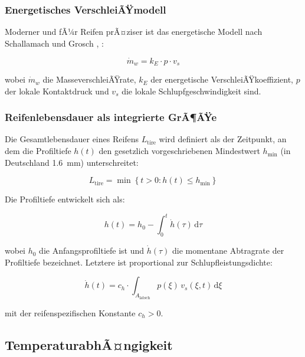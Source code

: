 ﻿\documentclass[12pt,a4paper]{article}
\theoremstyle{definition}
\theoremstyle{remark}
\newcommand{\Ltire}{L_{\mathrm{tire}}}
\begin{document}
\subsubsection{Energetisches VerschleiÃŸmodell}

Moderner und fÃ¼r Reifen prÃ¤ziser ist das energetische Modell nach
Schallamach und Grosch \cite{Schallamach1971}, \cite{Grosch1963}:

\begin{equation}
  \dot{m}_w = k_E \cdot p \cdot v_s
  \label{eq:energetisch}
\end{equation}

wobei $\dot{m}_w$ die MasseverschleiÃŸrate, $k_E$ der energetische
VerschleiÃŸkoeffizient, $p$ der lokale Kontaktdruck und $v_s$ die lokale
Schlupfgeschwindigkeit sind.

\subsubsection{Reifenlebensdauer als integrierte GrÃ¶ÃŸe}

Die Gesamtlebensdauer eines Reifens $\Ltire$ wird definiert als der
Zeitpunkt, an dem die Profiltiefe $h(t)$ den gesetzlich vorgeschriebenen
Mindest\-wert $h_{\min}$ (in Deutschland \SI{1,6}{\milli\metre}) unterschreitet:

\begin{equation}
  \Ltire = \min\!\left\{t > 0 : h(t) \leq h_{\min}\right\}
  \label{eq:life_def}
\end{equation}

Die Profiltiefe entwickelt sich als:

\begin{equation}
  h(t) = h_0 - \int_0^t \dot{h}(\tau)\,\mathrm{d}\tau
  \label{eq:profiltiefe}
\end{equation}

wobei $h_0$ die Anfangsprofiltiefe ist und $\dot{h}(\tau)$ die momentane
Abtragrate der Profiltiefe bezeichnet. Letztere ist proportional zur
Schlupfleistungsdichte:

\begin{equation}
  \dot{h}(t) = c_h \cdot \int_{A_{\mathrm{latsch}}} p(\xi)\,v_s(\xi,t)\,\mathrm{d}\xi
  \label{eq:hpunkt}
\end{equation}

mit der reifenspezifischen Konstante $c_h > 0$.

\subsection{TemperaturabhÃ¤ngigkeit}
\end{document}
